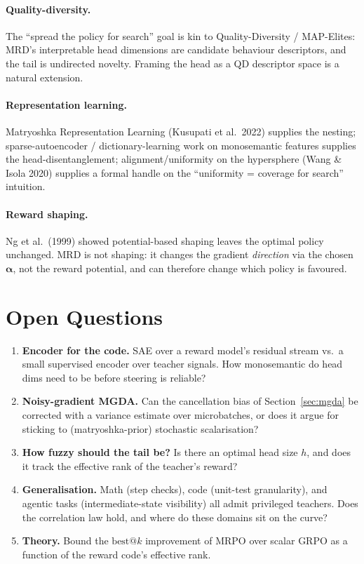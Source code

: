 \documentclass[11pt,a4paper]{article}
\makeatletter
\newcommand{\bestk}{\textrm{best}@k}
\makeatother
\begin{document}
\paragraph{Quality-diversity.}
The ``spread the policy for search'' goal is kin to Quality-Diversity /
MAP-Elites: MRD's interpretable head dimensions are candidate behaviour
descriptors, and the tail is undirected novelty.  Framing the head as a QD
descriptor space is a natural extension.

\paragraph{Representation learning.}
Matryoshka Representation Learning (Kusupati et al.\ 2022) supplies the
nesting; sparse-autoencoder / dictionary-learning work on monosemantic
features supplies the head-disentanglement; alignment/uniformity on the
hypersphere (Wang \& Isola 2020) supplies a formal handle on the
``uniformity = coverage for search'' intuition.

\paragraph{Reward shaping.}
Ng et al.\ (1999) showed potential-based shaping leaves the optimal policy
unchanged.  MRD is not shaping: it changes the gradient \emph{direction} via
the chosen $\bm\alpha$, not the reward potential, and can therefore change
which policy is favoured.

\section{Open Questions}
\label{sec:open}

\begin{enumerate}
\item \textbf{Encoder for the code.}  SAE over a reward model's residual
  stream vs.\ a small supervised encoder over teacher signals.  How
  monosemantic do head dims need to be before steering is reliable?
\item \textbf{Noisy-gradient MGDA.}  Can the cancellation bias of
  Section~\ref{sec:mgda} be corrected with a variance estimate over
  microbatches, or does it argue for sticking to (matryoshka-prior)
  stochastic scalarisation?
\item \textbf{How fuzzy should the tail be?}  Is there an optimal head size
  $h$, and does it track the effective rank of the teacher's reward?
\item \textbf{Generalisation.}  Math (step checks), code (unit-test
  granularity), and agentic tasks (intermediate-state visibility) all admit
  privileged teachers.  Does the correlation law hold, and where do these
  domains sit on the curve?
\item \textbf{Theory.}  Bound the $\bestk$ improvement of MRPO over scalar
  GRPO as a function of the reward code's effective rank.
\end{enumerate}
\end{document}
